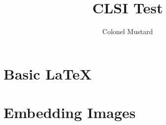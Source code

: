 \documentclass{report}
\title{CLSI Test}
\author{Colonel Mustard}
\begin{document}
  
  \chapter{Basic LaTeX}
  
  
  
  \chapter{Embedding Images}
  
  
  
\end{document}
